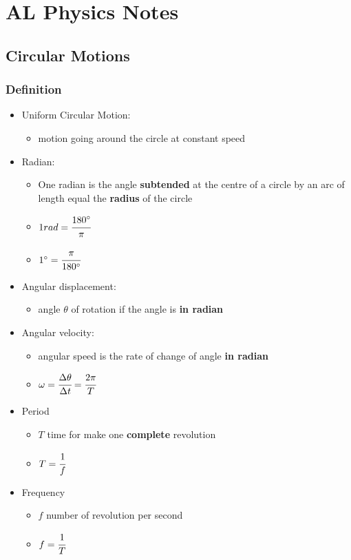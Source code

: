 \documentclass[]{article}
\date{}
\begin{document}
\section{AL Physics Notes}\label{header-n0}

\subsection{Circular Motions}\label{header-n2}

\subsubsection{Definition}\label{header-n3}

\begin{itemize}
\item
  Uniform Circular Motion:

  \begin{itemize}
  \item
    motion going around the circle at constant speed
  \end{itemize}
\item
  Radian:

  \begin{itemize}
  \item
    One radian is the angle \textbf{subtended} at the centre of a circle
    by an arc of length equal the \textbf{radius} of the circle
  \item
    \(1 \space rad = \cfrac{180^{\circ}}{\pi}\)
  \item
    \(1^{\circ} = \cfrac{\pi}{180^{\circ}}\)
  \end{itemize}
\item
  Angular displacement:

  \begin{itemize}
  \item
    angle \(\theta\) of rotation if the angle is \textbf{in radian}
  \end{itemize}
\item
  Angular velocity:

  \begin{itemize}
  \item
    angular speed is the rate of change of angle \textbf{in radian}
  \item
    \(\omega = \cfrac{\Delta \theta}{\Delta t}= \cfrac{2 \pi}{T} \)
  \end{itemize}
\item
  Period

  \begin{itemize}
  \item
    \(T\) time for make one \textbf{complete} revolution
  \item
    \(T=\cfrac{1}{f}\)
  \end{itemize}
\item
  Frequency

  \begin{itemize}
  \item
    \(f\) number of revolution per second
  \item
    \(f=\cfrac{1}{T}\)
  \end{itemize}
\end{itemize}
\end{document}
